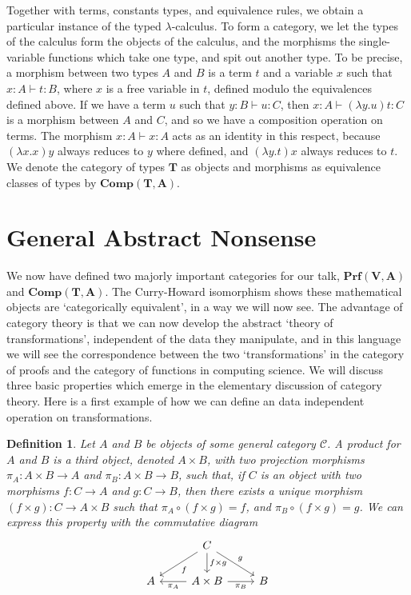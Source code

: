 \documentclass{article}
\theoremstyle{plain}
\newtheorem{definition}{Definition}
\begin{document}
Together with terms, constants types, and equivalence rules, we obtain a particular instance of the typed $\lambda$-calculus. To form a category, we let the types of the calculus form the objects of the calculus, and the morphisms the single-variable functions which take one type, and spit out another type. To be precise, a morphism between two types $A$ and $B$ is a term $t$ and a variable $x$ such that $x: A \vdash t: B$, where $x$ is a free variable in $t$, defined modulo the equivalences defined above. If we have a term $u$ such that $y: B \vdash u:C$, then $x:A \vdash (\lambda y.u)t: C$ is a morphism between $A$ and $C$, and so we have a composition operation on terms. The morphism $x: A \vdash x:A$ acts as an identity in this respect, because $(\lambda x.x)y$ always reduces to $y$ where defined, and $(\lambda y.t)x$ always reduces to $t$. We denote the category of types $\mathbf{T}$ as objects and morphisms as equivalence classes of types by $\mathbf{Comp}(\mathbf{T},\mathbf{A})$.

\section{General Abstract Nonsense}

We now have defined two majorly important categories for our talk, $\mathbf{Prf}(\mathbf{V}, \mathbf{A})$ and $\mathbf{Comp}(\mathbf{T},\mathbf{A})$. The Curry-Howard isomorphism shows these mathematical objects are `categorically equivalent', in a way we will now see. The advantage of category theory is that we can now develop the abstract `theory of transformations', independent of the data they manipulate, and in this language we will see the correspondence between the two `transformations' in the category of proofs and the category of functions in computing science. We will discuss three basic properties which emerge in the elementary discussion of category theory. Here is a first example of how we can define an data independent operation on transformations.

\begin{definition}
    Let $A$ and $B$ be objects of some general category $\mathcal{C}$. A product for $A$ and $B$ is a third object, denoted $A \times B$, with two projection morphisms $\pi_A: A \times B \to A$ and $\pi_B: A \times B \to B$, such that, if $C$ is an object with two morphisms $f: C \to A$ and $g: C \to B$, then there exists a unique morphism $(f \times g): C \to A \times B$ such that $\pi_A \circ (f \times g) = f$, and $\pi_B \circ (f \times g) = g$. We can express this property with the commutative diagram
    \[
    \begin{tikzcd}
         & C \arrow{ld}{f} \arrow{d}{f \times g} \arrow{rd}{g} & \\
        A & A \times B \arrow{l}{\pi_A} \arrow{r}[below]{\pi_B} & B
    \end{tikzcd}
    \]
\end{definition}
\end{document}
